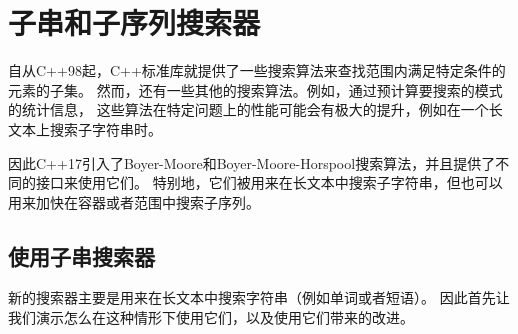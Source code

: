 \chapter{子串和子序列搜索器}\label{ch24}
自从C++98起，C++标准库就提供了一些搜索算法来查找范围内满足特定条件的元素的子集。
然而，还有一些其他的搜索算法。例如，通过预计算要搜索的模式的统计信息，
这些算法在特定问题上的性能可能会有极大的提升，例如在一个长文本上搜索子字符串时。

因此C++17引入了Boyer-Moore和Boyer-Moore-Horspool搜索算法，并且提供了不同的接口来使用它们。
特别地，它们被用来在长文本中搜索子字符串，但也可以用来加快在容器或者范围中搜索子序列。


\section{使用子串搜索器}
新的搜索器主要是用来在长文本中搜索字符串（例如单词或者短语）。
因此首先让我们演示怎么在这种情形下使用它们，以及使用它们带来的改进。

